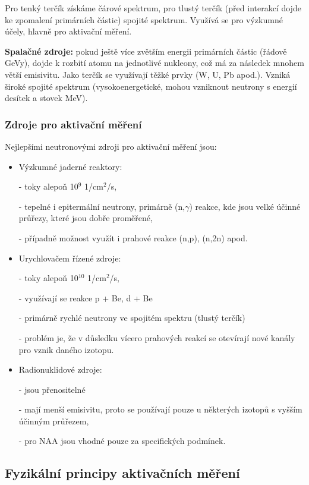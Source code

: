 Pro tenký terčík získáme čárové spektrum, pro tlustý terčík (před interakcí dojde ke zpomalení primárních částic) spojité spektrum. Využívá se pro výzkumné účely, hlavně pro aktivační měření.

\textbf{Spalačné zdroje:} pokud ještě více zvětším energii primárních částic (řádově GeVy), dojde k rozbití atomu na jednotlivé nukleony, což má za následek mnohem větší emisivitu. Jako terčík se využívají těžké prvky (W, U, Pb apod.). Vzniká široké spojité spektrum (vysokoenergetické, mohou vzniknout neutrony s energií desítek a stovek MeV).

\subsubsection{Zdroje pro aktivační měření}

Nejlepšími neutronovými zdroji pro aktivační měření jsou:

\begin{itemize}
    \item Výzkumné jaderné reaktory:
    \item[-] toky alepoň 10$^9$ 1/cm$^2$/s,
    \item[-] tepelné i epitermální neutrony, primárně (n,$\gamma$) reakce, kde jsou velké účinné průřezy, které jsou dobře proměřené,
    \item[-] případně možnost využít i prahové reakce (n,p), (n,2n) apod.
    \item Urychlovačem řízené zdroje:
    \item[-] toky alepoň 10$^{10}$ 1/cm$^2$/s,
    \item[-] využívají se reakce p + Be, d + Be
    \item[-] primárně rychlé neutrony ve spojitém spektru (tlustý terčík)
    \item[-] problém je, že v důsledku vícero prahových reakcí se otevírají nové kanály pro vznik daného izotopu. 
    \item Radionuklidové zdroje:
    \item[-] jsou přenositelné
    \item[-] mají menší emisivitu, proto se používají pouze u některých izotopů s vyšším účinným průřezem,
    \item[-] pro NAA jsou vhodné pouze za specifických podmínek. 
\end{itemize}

\subsection{Fyzikální principy aktivačních měření}

